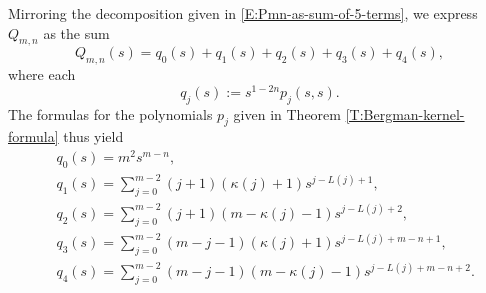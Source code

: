 \documentclass[letterpaper,11pt,reqno]{amsart}
\theoremstyle{plain}
\theoremstyle{definition}
\theoremstyle{remark}
\theoremstyle{remark}
\numberwithin{equation}{section}
\begin{document}
Mirroring the decomposition given in \eqref{E:Pmn-as-sum-of-5-terms}, we express $Q_{m,n}$ as the sum
\begin{equation}\label{E:Qmn-as-sum-of-5-terms}
Q_{m,n}(s) = q_0(s) + q_1(s) + q_2(s) + q_3(s) + q_4(s),
\end{equation}
where each 
\[
q_j(s) := s^{1-2n} p_j(s,s).
\]
The formulas for the polynomials $p_j$ given in Theorem \ref{T:Bergman-kernel-formula} thus yield
{\allowdisplaybreaks
\begin{subequations}\label{E:def-of-qjs}
\begin{align}
&q_0(s) = m^2 s^{m-n}, \label{E:def-of-q0} \\
&q_1(s) = \sum_{j=0}^{m-2} (j+1)(\kappa(j)+1) s^{j-L(j)+1}, \label{E:def-of-q1} \\
&q_2(s) = \sum_{j=0}^{m-2} (j+1)(m-\kappa(j)-1) s^{j-L(j)+2}, \label{E:def-of-q2} \\
&q_3(s) = \sum_{j=0}^{m-2} (m-j-1)(\kappa(j)+1) s^{j-L(j)+m-n+1}, \label{E:def-of-q3} \\
&q_4(s) = \sum_{j=0}^{m-2} (m-j-1)(m-\kappa(j)-1) s^{j-L(j)+m-n+2}. \label{E:def-of-q4} 
\end{align}
\end{subequations}
}
\end{document}
